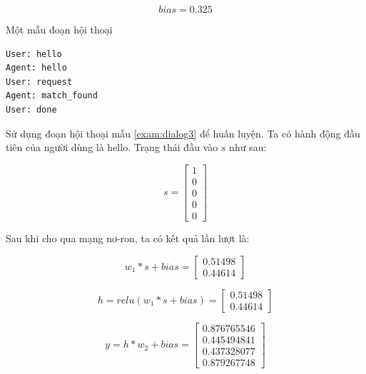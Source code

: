 \begin{equation*}
    bias = 0.325
\end{equation*}

\renewcommand{\textboxenvname}{Ví dụ}
\begin{textbox}{Một mẫu đoạn hội thoại}
\begin{Verbatim}[breaklines=true, breakanywhere=true]
User: hello
Agent: hello
User: request
Agent: match_found
User: done
\end{Verbatim}
\end{textbox}

Sử dụng đoạn hội thoại mẫu \ref{exam:dialog3} để huấn luyện. Ta có
hành động đầu tiên của người dùng là hello. Trạng thái đầu vào $s$
như sau:

\begin{equation*}
    s =
    \begin{bmatrix}
        1 \\
        0 \\
        0 \\
        0 \\
        0
    \end{bmatrix}
\end{equation*}

Sau khi cho qua mạng nơ-ron, ta có kết quả lần lượt là:

\begin{equation*}
    w_1*s + bias =
    \begin{bmatrix}
        0.51498 \\
        0.44614
    \end{bmatrix}
\end{equation*}

\begin{equation*}
    h = relu(w_1*s + bias) =
    \begin{bmatrix}
        0.51498 \\
        0.44614
    \end{bmatrix}
\end{equation*}

\begin{equation*}
    y = h*w_2 + bias =
    \begin{bmatrix}
        0.876765546 \\
        0.445494841 \\
        0.437328077 \\
        0.879267748
    \end{bmatrix}
\end{equation*}

